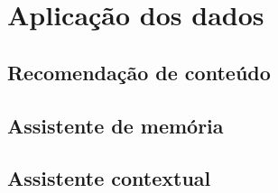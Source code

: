 \chapter{Aplicação dos dados}

\section{Recomendação de conteúdo}
\section{Assistente de memória}
\section{Assistente contextual}